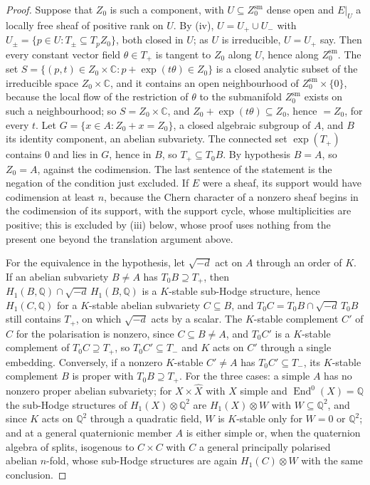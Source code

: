 \documentclass[11pt,reqno]{amsart}
\theoremstyle{plain}
\theoremstyle{definition}
\theoremstyle{remark}
\newcommand{\QQ}{\mathbb{Q}}
\newcommand{\CC}{\mathbb{C}}
\DeclareMathOperator{\End}{End}
\begin{document}
\begin{proof}
Suppose that $Z_{0}$ is such a component, with $U\subseteq Z_{0}^{\mathrm{sm}}$
dense open and $E|_{U}$ a locally free sheaf of positive rank on $U$. By
(iv), $U=U_{+}\cup U_{-}$ with
$U_{\pm}=\{p\in U:T_{\pm}\subseteq T_{p}Z_{0}\}$, both closed in $U$; as $U$
is irreducible, $U=U_{+}$ say. Then every constant vector field
$\theta\in T_{+}$ is tangent to $Z_{0}$ along $U$, hence along
$Z_{0}^{\mathrm{sm}}$. The set
$S=\{(p,t)\in Z_{0}\times\CC:p+\exp(t\theta)\in Z_{0}\}$ is a closed
analytic subset of the irreducible space $Z_{0}\times\CC$, and it contains
an open neighbourhood of $Z_{0}^{\mathrm{sm}}\times\{0\}$, because the local
flow of the restriction of $\theta$ to the submanifold $Z_{0}^{\mathrm{sm}}$
exists on such a neighbourhood; so $S=Z_{0}\times\CC$, and
$Z_{0}+\exp(t\theta)\subseteq Z_{0}$, hence $=Z_{0}$, for every $t$. Let
$G=\{x\in A:Z_{0}+x=Z_{0}\}$, a closed algebraic subgroup of $A$, and $B$
its identity component, an abelian subvariety. The connected set
$\exp(T_{+})$ contains $0$ and lies in $G$, hence in $B$, so
$T_{+}\subseteq T_{0}B$. By hypothesis $B=A$, so $Z_{0}=A$, against the
codimension. The last sentence of the statement is the negation of the
condition just excluded. If $E$ were a sheaf, its support would have
codimension at least $n$, because the Chern character of a nonzero sheaf
begins in the codimension of its support, with the support cycle, whose
multiplicities are positive; this is excluded by (iii)
below, whose proof uses nothing from the present one beyond the translation
argument above.

For the equivalence in the hypothesis, let $\sqrt{-d}$ act on $A$ through
an order of $K$. If an abelian subvariety $B\ne A$ has
$T_{0}B\supseteq T_{+}$, then $H_{1}(B,\QQ)\cap\sqrt{-d}\,H_{1}(B,\QQ)$ is a
$K$-stable sub-Hodge structure, hence $H_{1}(C,\QQ)$ for a $K$-stable abelian
subvariety $C\subseteq B$, and $T_{0}C=T_{0}B\cap\sqrt{-d}\,T_{0}B$ still
contains $T_{+}$, on which $\sqrt{-d}$ acts by a scalar. The $K$-stable
complement $C'$ of $C$ for the polarisation is nonzero, since
$C\subseteq B\ne A$, and $T_{0}C'$ is a $K$-stable complement of
$T_{0}C\supseteq T_{+}$, so $T_{0}C'\subseteq T_{-}$ and $K$ acts on $C'$
through a single embedding. Conversely, if a nonzero $K$-stable $C'\ne A$ has
$T_{0}C'\subseteq T_{-}$, its $K$-stable complement $B$ is proper with
$T_{0}B\supseteq T_{+}$. For the three cases: a simple $A$ has no nonzero
proper abelian subvariety; for $X\times\widehat X$ with $X$ simple and
$\End^{0}(X)=\QQ$ the sub-Hodge structures of $H_{1}(X)\otimes\QQ^{2}$ are
$H_{1}(X)\otimes W$ with $W\subseteq\QQ^{2}$, and since $K$ acts on
$\QQ^{2}$ through a quadratic field, $W$ is $K$-stable only for $W=0$ or
$\QQ^{2}$; and at a general quaternionic member $A$ is either simple or, when
the quaternion algebra of \cite[Setup~15.24]{paperI} splits, isogenous to $C\times C$
with $C$ a general
principally polarised abelian $n$-fold, whose sub-Hodge structures are again
$H_{1}(C)\otimes W$ with the same conclusion.
\end{proof}
\end{document}
